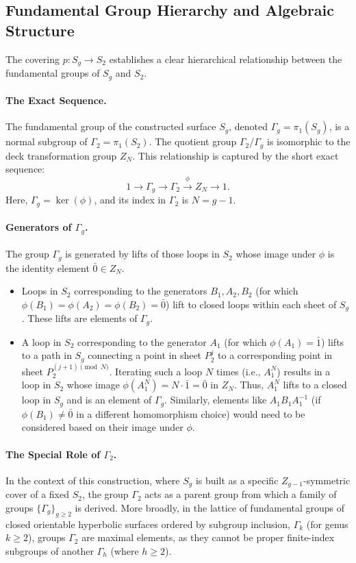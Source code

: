 \documentclass{article}
\theoremstyle{definition}
\theoremstyle{remark}
\begin{document}
\subsection{Fundamental Group Hierarchy and Algebraic Structure}

The covering $p: S_g \to S_2$ establishes a clear hierarchical relationship between the fundamental groups of $S_g$ and $S_2$.

\paragraph{The Exact Sequence.}
The fundamental group of the constructed surface $S_g$, denoted $\Gamma_g = \pi_1(S_g)$, is a normal subgroup of $\Gamma_2 = \pi_1(S_2)$. The quotient group $\Gamma_2/\Gamma_g$ is isomorphic to the deck transformation group $Z_N$. This relationship is captured by the short exact sequence:
\[
1 \to \Gamma_g \to \Gamma_2 \xrightarrow{\phi} Z_N \to 1.
\]
Here, $\Gamma_g = \ker(\phi)$, and its index in $\Gamma_2$ is $N = g-1$.

\paragraph{Generators of $\Gamma_g$.}
The group $\Gamma_g$ is generated by lifts of those loops in $S_2$ whose image under $\phi$ is the identity element $\bar{0} \in Z_N$.
\begin{itemize}
    \item Loops in $S_2$ corresponding to the generators $B_1, A_2, B_2$ (for which $\phi(B_1) = \phi(A_2) = \phi(B_2) = \bar{0}$) lift to closed loops within each sheet of $S_g$. These lifts are elements of $\Gamma_g$.
    \item A loop in $S_2$ corresponding to the generator $A_1$ (for which $\phi(A_1) = \bar{1}$) lifts to a path in $S_g$ connecting a point in sheet $P_2^j$ to a corresponding point in sheet $P_2^{(j+1) \pmod N}$. Iterating such a loop $N$ times (i.e., $A_1^N$) results in a loop in $S_2$ whose image $\phi(A_1^N) = N \cdot \bar{1} = \bar{0}$ in $Z_N$. Thus, $A_1^N$ lifts to a closed loop in $S_g$ and is an element of $\Gamma_g$. Similarly, elements like $A_1 B_1 A_1^{-1}$ (if $\phi(B_1) \neq \bar{0}$ in a different homomorphism choice) would need to be considered based on their image under $\phi$.
\end{itemize}

\paragraph{The Special Role of $\Gamma_2$.}
In the context of this construction, where $S_g$ is built as a specific $Z_{g-1}$-symmetric cover of a fixed $S_2$, the group $\Gamma_2$ acts as a parent group from which a family of groups $\{\Gamma_g\}_{g \ge 2}$ is derived. More broadly, in the lattice of fundamental groups of closed orientable hyperbolic surfaces ordered by subgroup inclusion, $\Gamma_k$ (for genus $k \ge 2$), groups $\Gamma_2$ are maximal elements, as they cannot be proper finite-index subgroups of another $\Gamma_h$ (where $h \ge 2$).
\end{document}
